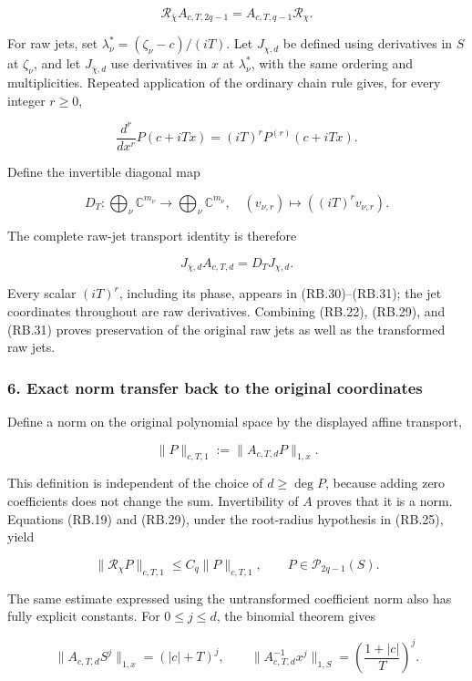 \[
\boxed{
\mathcal R_{\bar\chi}A_{c,T,2q-1}
=A_{c,T,q-1}\mathcal R_\chi.}
\tag{RB.29}
\]

For raw jets, set \(\lambda_\nu^*=(\zeta_\nu-c)/(iT)\). Let \(J_{\chi,d}\) be defined using derivatives in \(S\) at \(\zeta_\nu\), and let \(J_{\bar\chi,d}\) use derivatives in \(x\) at \(\lambda_\nu^*\), with the same ordering and multiplicities. Repeated application of the ordinary chain rule gives, for every integer \(r\geq0\),

\[
\frac{d^r}{dx^r}P(c+iTx)=(iT)^rP^{(r)}(c+iTx).
\]

Define the invertible diagonal map

\[
D_T:\bigoplus_\nu\mathbb C^{m_\nu}\longrightarrow
\bigoplus_\nu\mathbb C^{m_\nu},
\quad (v_{\nu,r})\longmapsto((iT)^rv_{\nu,r}).
\tag{RB.30}
\]

The complete raw-jet transport identity is therefore

\[
\boxed{J_{\bar\chi,d}A_{c,T,d}=D_TJ_{\chi,d}.}
\tag{RB.31}
\]

Every scalar \((iT)^r\), including its phase, appears in (RB.30)--(RB.31); the jet coordinates throughout are raw derivatives. Combining (RB.22), (RB.29), and (RB.31) proves preservation of the original raw jets as well as the transformed raw jets.

\subsubsection{6. Exact norm transfer back to the original coordinates}\label{endpoint-relation_balance_original--exact-norm-transfer-back-to-the-original-coordinates}

Define a norm on the original polynomial space by the displayed affine transport,

\[
\|P\|_{c,T,1}:=\|A_{c,T,d}P\|_{1,x}.
\tag{RB.32}
\]

This definition is independent of the choice of \(d\geq\deg P\), because adding zero coefficients does not change the sum. Invertibility of \(A\) proves that it is a norm. Equations (RB.19) and (RB.29), under the root-radius hypothesis in (RB.25), yield

\[
\boxed{\|\mathcal R_\chi P\|_{c,T,1}
\leq C_q\|P\|_{c,T,1},
\qquad P\in\mathcal P_{2q-1}(S).}
\tag{RB.33}
\]

The same estimate expressed using the untransformed coefficient norm also has fully explicit constants. For \(0\leq j\leq d\), the binomial theorem gives

\[
\|A_{c,T,d}S^j\|_{1,x}=(|c|+T)^j,
\qquad
\|A_{c,T,d}^{-1}x^j\|_{1,S}
=\left(\frac{1+|c|}{T}\right)^j.
\tag{RB.34}
\]

